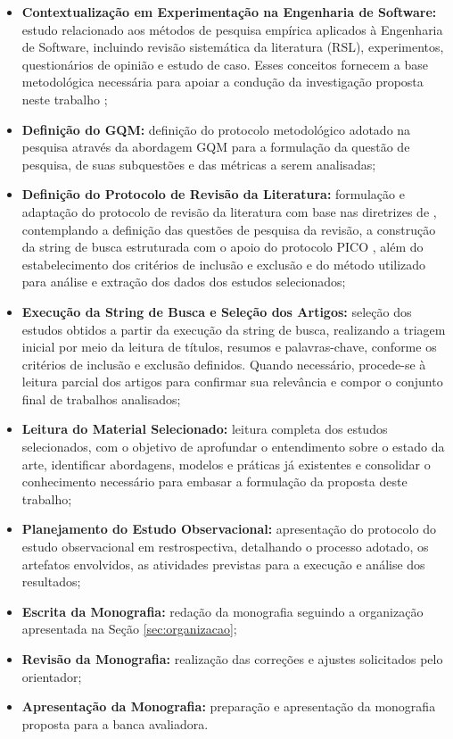 \begin{itemize}
    \item \textbf{Contextualização em Experimentação na Engenharia de Software:} estudo relacionado aos métodos de pesquisa empírica aplicados à Engenharia de Software, incluindo revisão sistemática da literatura (RSL), experimentos, questionários de opinião e estudo de caso. Esses conceitos fornecem a base metodológica necessária para apoiar a condução da investigação proposta neste trabalho \cite{Wohlin:2012:ESE:2349018};    
    \item \textbf{Definição do GQM:} definição do protocolo metodológico adotado na pesquisa através da abordagem GQM \cite{Basili1994} para a formulação da questão de pesquisa, de suas subquestões e das métricas a serem analisadas;
    \item \textbf{Definição do Protocolo de Revisão da Literatura:} formulação e adaptação do protocolo de revisão da literatura com base nas diretrizes de , contemplando a definição das questões de pesquisa da revisão, a construção da string de busca estruturada com o apoio do protocolo PICO \cite{Pai2004}, além do estabelecimento dos critérios de inclusão e exclusão e do método utilizado para análise e extração dos dados dos estudos selecionados;
    \item \textbf{Execução da String de Busca e Seleção dos Artigos:} seleção dos estudos obtidos a partir da execução da string de busca, realizando a triagem inicial por meio da leitura de títulos, resumos e palavras-chave, conforme os critérios de inclusão e exclusão definidos. Quando necessário, procede-se à leitura parcial dos artigos para confirmar sua relevância e compor o conjunto final de trabalhos analisados;
    \item \textbf{Leitura do Material Selecionado:} leitura completa dos estudos selecionados, com o objetivo de aprofundar o entendimento sobre o estado da arte, identificar abordagens, modelos e práticas já existentes e consolidar o conhecimento necessário para embasar a formulação da proposta deste trabalho;
    \item \textbf{Planejamento do Estudo Observacional:} apresentação do protocolo do estudo observacional em restrospectiva, detalhando o processo adotado, os artefatos envolvidos, as atividades previstas para a execução e análise dos resultados;
    \item \textbf{Escrita da Monografia:} redação da monografia seguindo a organização apresentada na Seção \ref{sec:organizacao};
    \item \textbf{Revisão da Monografia:} realização das correções e ajustes solicitados pelo orientador;
    \item \textbf{Apresentação da Monografia:} preparação e apresentação da monografia proposta para a banca avaliadora.
\end{itemize}

